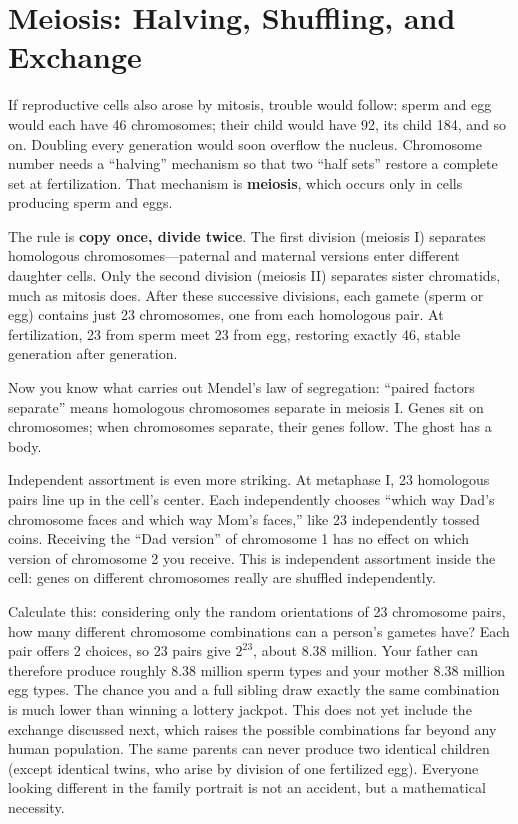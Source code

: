 \section{Meiosis: Halving, Shuffling, and Exchange}

If reproductive cells also arose by mitosis, trouble would follow: sperm and egg would each have 46 chromosomes; their child would have 92, its child 184, and so on. Doubling every generation would soon overflow the nucleus. Chromosome number needs a ``halving'' mechanism so that two ``half sets'' restore a complete set at fertilization. That mechanism is \textbf{meiosis}, which occurs only in cells producing sperm and eggs.

The rule is \textbf{copy once, divide twice}. The first division (meiosis I) separates homologous chromosomes---paternal and maternal versions enter different daughter cells. Only the second division (meiosis II) separates sister chromatids, much as mitosis does. After these successive divisions, each gamete (sperm or egg) contains just 23 chromosomes, one from each homologous pair. At fertilization, 23 from sperm meet 23 from egg, restoring exactly 46, stable generation after generation.

Now you know what carries out Mendel's law of segregation: ``paired factors separate'' means homologous chromosomes separate in meiosis I. Genes sit on chromosomes; when chromosomes separate, their genes follow. The ghost has a body.

Independent assortment is even more striking. At metaphase I, 23 homologous pairs line up in the cell's center. Each independently chooses ``which way Dad's chromosome faces and which way Mom's faces,'' like 23 independently tossed coins. Receiving the ``Dad version'' of chromosome 1 has no effect on which version of chromosome 2 you receive. This is independent assortment inside the cell: genes on different chromosomes really are shuffled independently.

\begin{qiaoliang}
Calculate this: considering only the random orientations of 23 chromosome pairs, how many different chromosome combinations can a person's gametes have? Each pair offers 2 choices, so 23 pairs give $2^{23}$, about 8.38 million. Your father can therefore produce roughly 8.38 million sperm types and your mother 8.38 million egg types. The chance you and a full sibling draw exactly the same combination is much lower than winning a lottery jackpot. This does not yet include the exchange discussed next, which raises the possible combinations far beyond any human population. The same parents can never produce two identical children (except identical twins, who arise by division of one fertilized egg). Everyone looking different in the family portrait is not an accident, but a mathematical necessity.
\end{qiaoliang}

